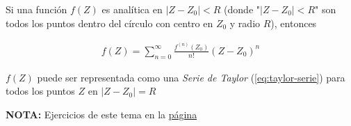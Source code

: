 
Si una función $f(Z)$ es analítica en \( |Z - Z_0| < R \) (donde "$|Z - Z_0| < R$" son todos los puntos dentro del círculo con centro en $Z_0$ y radio $R$), entonces

\begin{align}
    f(Z) = \sum_{n=0}^{\infty} \frac{f^{(n)}(Z_0)}{n!}(Z-Z_0)^n \label{eq:taylor-serie}
\end{align}

$f(Z)$ puede ser representada como una \textit{Serie de Taylor} (\ref{eq:taylor-serie}) para todos los puntos $Z$ en $|Z - Z_0| = R$

\textbf{NOTA:} Ejercicios de este tema en la \hyperref[ex:taylor-series]{página \pageref{ex:taylor-series}}
